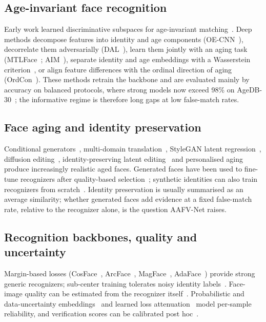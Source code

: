 \documentclass[journal]{IEEEtran}
\begin{document}
\subsection{Age-invariant face recognition}
Early work learned discriminative subspaces for age-invariant matching~\cite{li2011aifr}. Deep methods decompose features into identity and age components (OE-CNN~\cite{wang2018oecnn}), decorrelate them adversarially (DAL~\cite{wang2019dal}), learn them jointly with an aging task (MTLFace~\cite{huang2021mtlface}; AIM~\cite{zhao2022aim}), separate identity and age embeddings with a Wasserstein criterion~\cite{dahan2023wasserstein}, or align feature differences with the ordinal direction of aging (OrdCon~\cite{wang2025ordcon}). These methods retrain the backbone and are evaluated mainly by accuracy on balanced protocols, where strong models now exceed 98\% on AgeDB-30~\cite{moschoglou2017agedb,dahan2023wasserstein}; the informative regime is therefore long gaps at low false-match rates.

\subsection{Face aging and identity preservation}
Conditional generators~\cite{zhang2017caae,tang2018ipcgan,huang2021pfagan}, multi-domain translation~\cite{orel2020lifespan}, StyleGAN latent regression~\cite{karras2020stylegan2,richardson2021psp,alaluf2021sam}, diffusion editing~\cite{chen2023fading,banerjee2023aging}, identity-preserving latent editing~\cite{luevano2025aging} and personalised aging~\cite{qi2025mytimemachine,su2025timebooth} produce increasingly realistic aged faces. Generated faces have been used to fine-tune recognizers after quality-based selection~\cite{huang2022mtlfacetpami,banerjee2023aging}; synthetic identities can also train recognizers from scratch~\cite{boutros2023idiff}. Identity preservation is usually summarised as an average similarity; whether generated faces add evidence at a fixed false-match rate, relative to the recognizer alone, is the question AAFV-Net raises.

\subsection{Recognition backbones, quality and uncertainty}
Margin-based losses (CosFace~\cite{wang2018cosface}, ArcFace~\cite{deng2019arcface}, MagFace~\cite{meng2021magface}, AdaFace~\cite{kim2022adaface}) provide strong generic recognizers; sub-center training tolerates noisy identity labels~\cite{deng2020subcenter}. Face-image quality can be estimated from the recognizer itself~\cite{meng2021magface,terhorst2020serfiq,boutros2023crfiqa}. Probabilistic and data-uncertainty embeddings~\cite{shi2019pfe,chang2020dul,ahn2024ucface} and learned loss attenuation~\cite{kendall2017uncertainty} model per-sample reliability, and verification scores can be calibrated post hoc~\cite{xu2024asc}.
\end{document}
